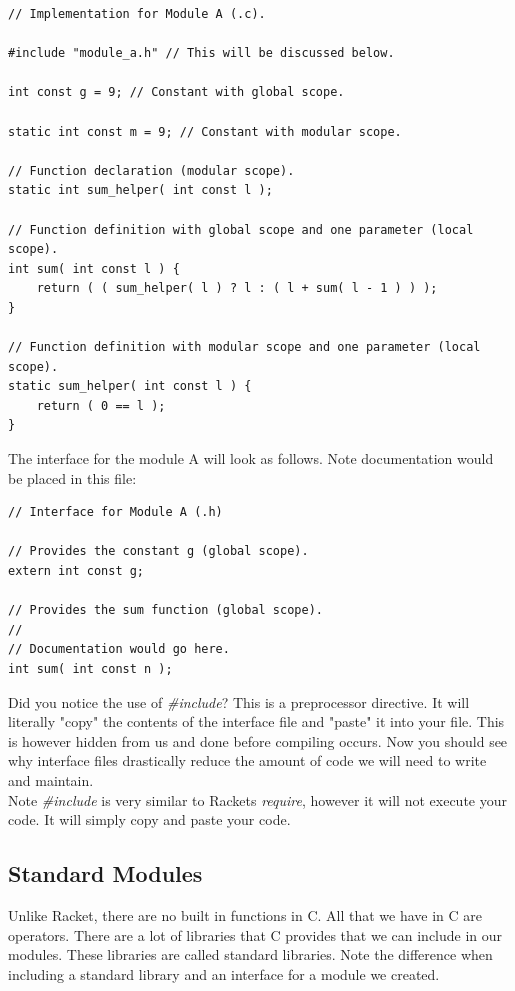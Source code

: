 \documentclass[12pt,extarticle]{article}
\begin{document}
\lstset {
	language=c
}
\begin{lstlisting}
// Implementation for Module A (.c).

#include "module_a.h" // This will be discussed below.

int const g = 9; // Constant with global scope.

static int const m = 9; // Constant with modular scope.

// Function declaration (modular scope).
static int sum_helper( int const l );

// Function definition with global scope and one parameter (local scope).
int sum( int const l ) {
	return ( ( sum_helper( l ) ? l : ( l + sum( l - 1 ) ) );
}

// Function definition with modular scope and one parameter (local scope).
static sum_helper( int const l ) {
	return ( 0 == l );
}
\end{lstlisting}

The interface for the module A will look as follows. Note documentation would be placed in this file:\\

\lstset {
	language=c
}
\begin{lstlisting}
// Interface for Module A (.h)

// Provides the constant g (global scope).
extern int const g;

// Provides the sum function (global scope).
//
// Documentation would go here.
int sum( int const n );
\end{lstlisting}

Did you notice the use of \emph{\#include}? This is a preprocessor directive. It will literally "copy" the contents of the interface file and "paste" it into your file. This is however hidden from us and done before compiling occurs. Now you should see why interface files drastically reduce the amount of code we will need to write and maintain.\\

Note \emph{\#include} is very similar to Rackets \emph{require}, however it will not execute your code. It will simply copy and paste your code.

\subsection{Standard Modules}

Unlike Racket, there are no built in functions in C. All that we have in C are operators. There are a lot of libraries that C provides that we can include in our modules. These libraries are called standard libraries. Note the difference when including a standard library and an interface for a module we created.\\
\end{document}
